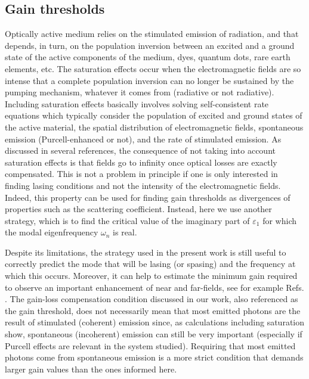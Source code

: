 \documentclass[9pt,twocolumn,twoside]{osajnl}
\begin{document}
\subsection{Gain thresholds}
Optically active medium relies on the stimulated emission of radiation, and that depends, in turn, on the population inversion between an excited and a ground state of the active components of the medium, dyes, quantum dots, rare earth elements, etc. The saturation effects occur when the electromagnetic fields are so intense that a complete population inversion can no longer be sustained by the pumping mechanism, whatever it comes from (radiative or not radiative).
%
Including saturation effects basically involves solving self-consistent rate equations which typically consider the population of excited and ground states of the active material, the spatial distribution of electromagnetic fields, spontaneous emission (Purcell-enhanced or not), and the rate of stimulated emission.
As discussed in several references,\cite{arnold2015,passarelli2016} the consequence of not taking into account saturation effects is that fields go to infinity once optical losses are exactly compensated.
This is not a problem in principle if one is only interested in finding lasing conditions and not the intensity of the electromagnetic fields. Indeed, this property can be used for finding gain thresholds as divergences of properties such as the scattering coefficient.\cite{passarelli2016,passarelli2019}
Instead, here we use another strategy, which is to find the critical value of the imaginary part of $\varepsilon_1$ for which the modal eigenfrequency $\omega_n$ is real.\cite{smotrova2011,passarelli2019,nosich}

Despite its limitations, the strategy used in the present work is still useful to correctly predict the mode that will be lasing (or spasing) and the frequency at which this occurs. Moreover, it can help to estimate the minimum gain required to observe an important enhancement of near and far-fields, see for example Refs. \cite{arnold2015,nosich}. The gain-loss compensation condition discussed in our work, also referenced as the gain threshold,\cite{passarelli2019} does not necessarily mean that most emitted photons are the result of stimulated (coherent) emission since, as calculations including saturation show, spontaneous (incoherent) emission can still be very important (especially if Purcell effects are relevant in the system studied). Requiring that most emitted photons come from spontaneous emission is a more strict condition that demands larger gain values than the ones informed here.\cite{khurgin2012,khurgin2021}
\end{document}
